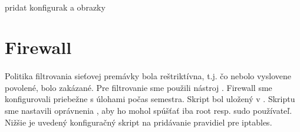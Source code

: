 \paragraph{}
pridat konfigurak a obrazky

\section{Firewall}
\paragraph{}
Politika filtrovania sieťovej premávky bola reštriktívna, t.j. čo nebolo vyslovene povolené, bolo zakázané. Pre filtrovanie sme použili nástroj . Firewall sme konfigurovali priebežne s úlohami počas semestra. Skript bol uložený v . Skriptu sme nastavili oprávnenia , aby ho mohol spúšťať iba root resp. sudo používateľ. Nižšie je uvedený konfiguračný skript na pridávanie pravidiel pre iptables.

